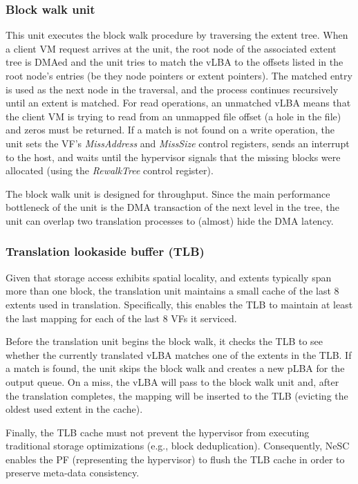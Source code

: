 \subsubsection*{Block walk unit}
This unit executes the block walk procedure by traversing the extent tree.
When a client VM request arrives at the unit, the root node of the associated extent tree is DMAed and the unit tries to match the vLBA to the offsets listed in the root node's entries (be they node pointers or extent pointers). The matched entry is used as the next node in the traversal, and the process continues recursively until an extent is matched. For read operations, an unmatched vLBA means that the client VM is trying to read from an unmapped file offset (a hole in the file) and zeros must be returned. If a match is not found on a write operation, the unit sets the VF's \emph{MissAddress} and \emph{MissSize} control registers, sends an interrupt to the host, and waits until the hypervisor signals that the missing blocks were allocated (using the \emph{RewalkTree} control register).

The block walk unit is designed for throughput. Since the main performance bottleneck of the unit is the DMA transaction of the next level in the tree, the unit can overlap two translation processes to (almost) hide the DMA latency.

\subsubsection*{Translation lookaside buffer (TLB)}
Given that storage access exhibits spatial locality, and  extents typically span more than one block, the translation unit maintains a small cache of the last 8 extents used in translation. Specifically, this enables the TLB to maintain at least the last mapping for each of the last 8 VFs it serviced.

Before the translation unit begins the block walk, it checks the TLB to see whether the currently translated vLBA matches one of the extents in the TLB. If a match is found, the unit skips the block walk and creates a new pLBA for the output queue.
On a miss, the vLBA will pass to the block walk unit and, after the translation completes, the mapping will be inserted to the TLB (evicting the oldest used extent in the cache).

Finally, the TLB cache must not prevent the hypervisor from executing traditional storage optimizations (e.g., block deduplication). Consequently, NeSC enables the PF (representing the hypervisor) to flush the TLB cache in order to preserve meta-data consistency.

